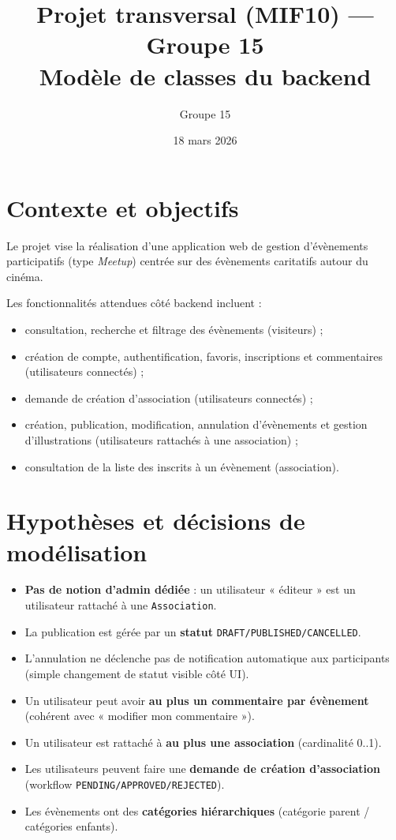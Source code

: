 \documentclass[11pt,a4paper]{article}
\title{Projet transversal (MIF10) — Groupe 15\\\vspace{0.2cm}Modèle de classes du backend}
\author{Groupe 15}
\date{18 mars 2026}
\begin{document}
\maketitle

\section{Contexte et objectifs}
Le projet vise la réalisation d’une application web de gestion d’évènements participatifs (type \textit{Meetup}) centrée sur des évènements caritatifs autour du cinéma.

Les fonctionnalités attendues côté backend incluent :
\begin{itemize}
  \item consultation, recherche et filtrage des évènements (visiteurs) ;
  \item création de compte, authentification, favoris, inscriptions et commentaires (utilisateurs connectés) ;
  \item demande de création d’association (utilisateurs connectés) ;
  \item création, publication, modification, annulation d’évènements et gestion d’illustrations (utilisateurs rattachés à une association) ;
  \item consultation de la liste des inscrits à un évènement (association).
\end{itemize}

\section{Hypothèses et décisions de modélisation}
\begin{itemize}
  \item \textbf{Pas de notion d’admin dédiée} : un utilisateur « éditeur » est un utilisateur rattaché à une \texttt{Association}.
  \item La publication est gérée par un \textbf{statut} \texttt{DRAFT/PUBLISHED/CANCELLED}.
  \item L’annulation ne déclenche pas de notification automatique aux participants (simple changement de statut visible côté UI).
  \item Un utilisateur peut avoir \textbf{au plus un commentaire par évènement} (cohérent avec « modifier mon commentaire »).
  \item Un utilisateur est rattaché à \textbf{au plus une association} (cardinalité 0..1).
  \item Les utilisateurs peuvent faire une \textbf{demande de création d’association} (workflow \texttt{PENDING/APPROVED/REJECTED}).
  \item Les évènements ont des \textbf{catégories hiérarchiques} (catégorie parent / catégories enfants).
\end{itemize}
\end{document}
